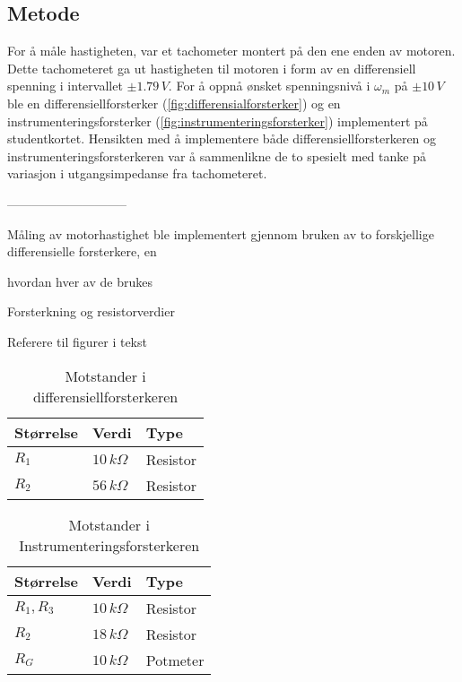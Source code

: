 \subsection{Metode}

For å måle hastigheten, var et tachometer montert på den ene enden av motoren. Dette tachometeret ga ut hastigheten til motoren i form av en differensiell spenning i intervallet $\pm1.79\,V$. For å oppnå ønsket spenningsnivå i $\omega_m$ på $\pm10\,V$ ble en differensiellforsterker (\autoref{fig:differensialforsterker}) og en instrumenteringsforsterker (\autoref{fig:instrumenteringsforsterker}) implementert på studentkortet.
Hensikten med å implementere både differensiellforsterkeren og instrumenteringsforsterkeren var å sammenlikne de to spesielt med tanke på variasjon i utgangsimpedanse fra tachometeret.




-----------------------------

Måling av motorhastighet ble implementert gjennom bruken av to forskjellige differensielle forsterkere, en 

hvordan hver av de brukes

Forsterkning og resistorverdier

Referere til figurer i tekst



\begin{table}[h]
	\centering
    \caption{Motstander i differensiellforsterkeren}
	\begin{tabular}{lll}
		\toprule
		Størrelse & Verdi & Type \\
		\midrule
        $R_1$ & $10\,k\Omega$& Resistor \\
        $R_2$ & $56\,k\Omega$ & Resistor\\
		\bottomrule
	\end{tabular}
\label{tab:eksempeltabell}
\end{table}


\begin{table}[h]
	\centering
    \caption{Motstander i Instrumenteringsforsterkeren}
	\begin{tabular}{lll}
		\toprule
		Størrelse & Verdi & Type \\
		\midrule
        $R_1, R_3$ & $10\,k\Omega$& Resistor \\
        $R_2$ & $18\,k\Omega$ & Resistor\\
        $R_G$ & $10\,k\Omega$ & Potmeter\\
		\bottomrule
	\end{tabular}
    
\label{tab:eksempeltabell}
\end{table}

